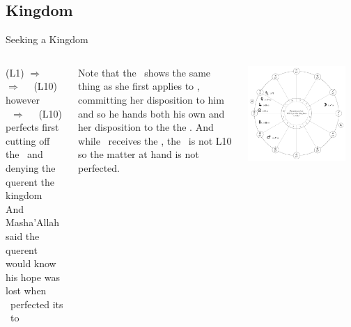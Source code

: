\subsection{Kingdom}
\begin{frame}[t]{Seeking a Kingdom}
\begin{columns}[T, onlytextwidth]
\Mercury\Retrograde (L1) $\Rightarrow$ \Conjunction\Sun\ $\Rightarrow$ \Sextile\ \Saturn\ (L10) \\
however \\
\Mars\ $\Rightarrow$ \Square\ \Saturn\ (L10) perfects first \\
cutting off the \Sun\ and denying the querent the kingdom \\
\vspace{0.25cm}
And Masha'Allah said the querent would know his hope was lost when \Mars\ perfected its \Square\ to \Saturn \\
\vspace{0.25cm}

Note that the \Moon\ shows the same thing as she first applies to \Mercury, committing her disposition to him and so he hands both his own and her disposition to the the \Sun. And
while  \Mercury\ receives the \Sun, the \Sun\ is not L10 so the matter at hand is not perfected. \\


\begin{center}
{\includegraphics[width=0.9\textwidth]{charts/50-chart-kingdom}} \\
\end{center}
\end{columns}
\end{frame}